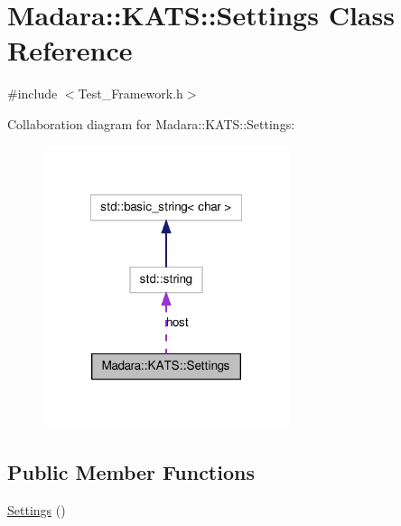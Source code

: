 \hypertarget{classMadara_1_1KATS_1_1Settings}{
\section{Madara::KATS::Settings Class Reference}
\label{d0/ddd/classMadara_1_1KATS_1_1Settings}
}


{\ttfamily \#include $<$Test\_\-Framework.h$>$}



Collaboration diagram for Madara::KATS::Settings:
\nopagebreak
\begin{figure}[H]
\begin{center}
\leavevmode
\includegraphics[width=204pt]{d7/d7f/classMadara_1_1KATS_1_1Settings__coll__graph}
\end{center}
\end{figure}
\subsection*{Public Member Functions}
\begin{DoxyCompactItemize}
\item 
\hyperlink{classMadara_1_1KATS_1_1Settings_ae4376c5f64478fe2351b65469c349317}{Settings} ()
\end{DoxyCompactItemize}
